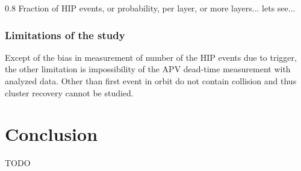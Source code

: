                  {0.8}       %
                 {Fraction of HIP events, or probability, per layer, or more layers... lets see... } %

\subsubsection{Limitations of the study}
 
Except of the bias in measurement of number of the HIP events due to trigger, the other limitation is impossibility of the APV dead-time measurement with analyzed data. Other than first event in orbit do not contain collision and thus cluster recovery cannot be studied. 

\section{Conclusion}
TODO



